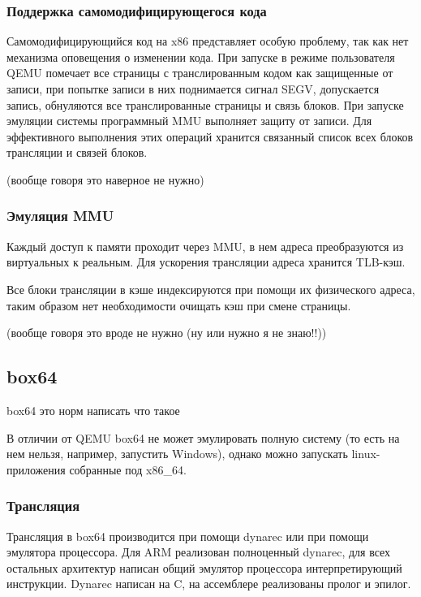 \subsubsection{Поддержка самомодифицирующегося кода}

Самомодифицирующийся код на x86 представляет особую проблему, так как нет механизма оповещения о изменении кода. При запуске в режиме пользователя QEMU помечает все страницы с транслированным кодом как защищенные от записи, при попытке записи в них поднимается сигнал SEGV, допускается запись, обнуляются все транслированные страницы и связь блоков. При запуске эмуляции системы программный MMU выполняет защиту от записи.
Для эффективного выполнения этих операций хранится связанный список всех блоков трансляции и связей блоков.

(вообще говоря это наверное не нужно)

\subsubsection{Эмуляция MMU}

Каждый доступ к памяти проходит через MMU, в нем адреса преобразуются из виртуальных к реальным. Для ускорения трансляции адреса хранится TLB-кэш.

Все блоки трансляции в кэше индексируются при помощи их физического адреса, таким образом нет необходимости очищать кэш при смене страницы. \cite{qemu_docs}

(вообще говоря это вроде не нужно (ну или нужно я не знаю!!))

\subsection{box64}

box64 это норм написать что такое

В отличии от QEMU box64 не может эмулировать полную систему (то есть на нем нельзя, например, запустить Windows), однако можно запускать linux-приложения собранные под x86\_64.

\subsubsection{Трансляция}

Трансляция в box64 производится при помощи dynarec или при помощи эмулятора процессора. Для ARM реализован полноценный dynarec, для всех остальных архитектур написан общий эмулятор процессора интерпретирующий инструкции. Dynarec написан на C, на ассемблере реализованы пролог и эпилог.


